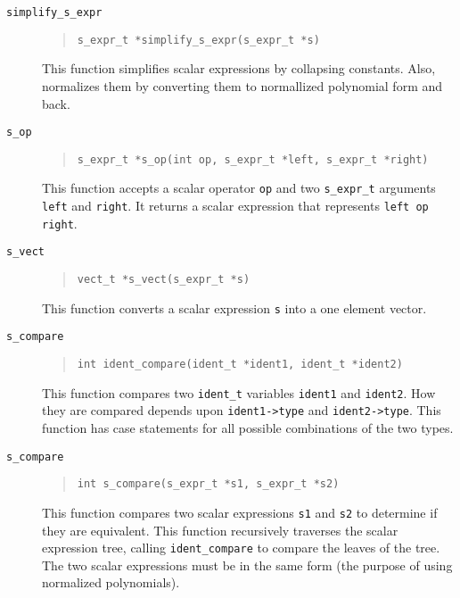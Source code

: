 \begin{description}
\item[{\tt simplify\_s\_expr}]
\begin{quote}
\begin{verbatim}
s_expr_t *simplify_s_expr(s_expr_t *s)
\end{verbatim}
\end{quote}
This function simplifies scalar expressions by collapsing constants.
Also, normalizes them by converting them to normallized polynomial form
and back.

\item[{\tt s\_op}]
\begin{quote}
\begin{verbatim}
s_expr_t *s_op(int op, s_expr_t *left, s_expr_t *right)
\end{verbatim}
\end{quote}
This function accepts a scalar operator {\tt op}  and two {\tt s\_expr\_t}
arguments {\tt left} and {\tt right}.  It returns
a scalar expression that represents {\tt left op right}.

\item[{\tt s\_vect}]
\begin{quote}
\begin{verbatim}
vect_t *s_vect(s_expr_t *s)
\end{verbatim}
\end{quote}
This function converts a scalar expression {\tt s} into a one element
vector. 

\item[{\tt s\_compare}]
\begin{quote}
\begin{verbatim}
int ident_compare(ident_t *ident1, ident_t *ident2)
\end{verbatim}
\end{quote}
This function compares two {\tt ident\_t} variables {\tt ident1} and
{\tt ident2}.  How they are compared depends upon {\tt ident1->type}
and {\tt ident2->type}.  This function has case statements for all
possible combinations of the two types.

\item[{\tt s\_compare}]
\begin{quote}
\begin{verbatim}
int s_compare(s_expr_t *s1, s_expr_t *s2)
\end{verbatim}
\end{quote}
This function compares two scalar expressions {\tt s1} and {\tt s2} to
determine if they are equivalent.  This function recursively traverses
the scalar expression tree, calling {\tt ident\_compare} to compare the
leaves of the tree.
The two scalar expressions must be in the same form (the
purpose of using normalized polynomials).
\end{description}


